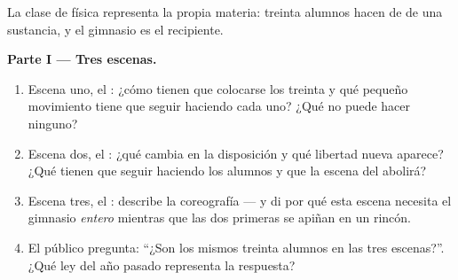 \begin{problem}\label{pb:g7:states-of-matter:1}
La clase de física representa la propia materia: treinta alumnos hacen
de  de una sustancia, y el gimnasio es el recipiente.

\medskip\noindent\textbf{Parte I --- Tres escenas.}
\begin{enumerate}
  \item Escena uno, el : ¿cómo tienen que colocarse los
        treinta y qué pequeño movimiento tiene que seguir haciendo
        cada uno? ¿Qué no puede hacer ninguno?
  \item Escena dos, el : ¿qué cambia en la disposición y qué
        libertad nueva aparece? ¿Qué tienen que seguir haciendo los
        alumnos y que la escena del  abolirá?
  \item Escena tres, el : describe la coreografía --- y di por
        qué esta escena necesita el gimnasio \emph{entero} mientras
        que las dos primeras se apiñan en un rincón.
  \item El público pregunta: ``¿Son los mismos treinta alumnos en las
        tres escenas?''. ¿Qué ley del año pasado representa la
        respuesta?
\end{enumerate}


\end{problem}
